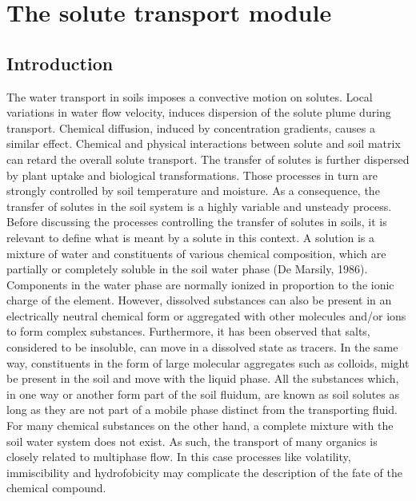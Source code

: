 \chapter {The solute transport module}
\section{ Introduction}

The water transport in soils imposes a convective motion on solutes. Local variations in water flow velocity, induces dispersion of the solute plume during transport. Chemical diffusion, induced by concentration gradients, causes a similar effect. Chemical and physical interactions between solute and soil matrix can retard the overall solute transport. The transfer of solutes is further dispersed by plant uptake and biological transformations. Those processes in turn are strongly controlled by soil temperature and moisture. As a consequence, the transfer of solutes in the soil system is a highly variable and unsteady process.\\

Before discussing the processes controlling the transfer of solutes in soils, it is relevant to define what is meant by a solute in this context. A solution is a mixture of water and constituents of various chemical composition, which are partially or completely soluble in the soil water phase (De Marsily, 1986). Components in the water phase are normally ionized in proportion to the ionic charge of the element. However, dissolved substances can also be present in an electrically neutral chemical form or aggregated with other molecules and/or ions to form complex substances. Furthermore, it has been observed that salts, considered to be insoluble, can move in a dissolved state as tracers. In the same way, constituents in the form of large molecular aggregates such as colloids, might be present in the soil and move with the liquid phase. All the substances which, in one way or another form part of the soil fluidum, are known as soil solutes as long as they are not part of a mobile phase distinct from the transporting fluid. For many chemical substances on the other hand, a complete mixture with the soil water system does not exist. As such, the transport of many organics is closely related to multiphase flow. In this case processes like volatility, immiscibility and hydrofobicity may complicate the description of the fate of the chemical compound.\\

